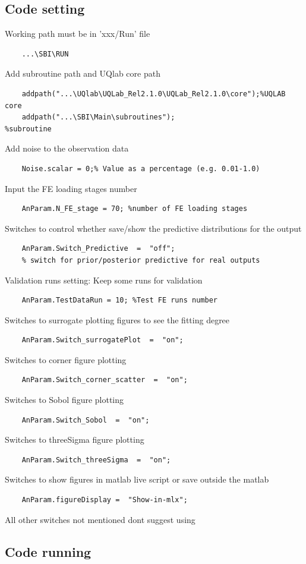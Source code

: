\documentclass{ol-softwaremanual}
\begin{document}
\subsection*{Code setting}
Working path must be in 'xxx/Run' file
\begin{verbatim}
    ...\SBI\RUN
\end{verbatim}
Add subroutine path and UQlab core path
\begin{verbatim}
    addpath("...\UQlab\UQLab_Rel2.1.0\UQLab_Rel2.1.0\core");%UQLAB core 
    addpath("...\SBI\Main\subroutines");                    %subroutine 
\end{verbatim}
Add noise to the observation data
\begin{verbatim}
    Noise.scalar = 0;% Value as a percentage (e.g. 0.01-1.0)
\end{verbatim}
Input the FE loading stages number
\begin{verbatim}
    AnParam.N_FE_stage = 70; %number of FE loading stages
\end{verbatim}
Switches to control whether save/show the predictive distributions for the output
\begin{verbatim}
    AnParam.Switch_Predictive  =  "off";
    % switch for prior/posterior predictive for real outputs
\end{verbatim}
Validation runs setting: Keep some runs for validation
\begin{verbatim}
    AnParam.TestDataRun = 10; %Test FE runs number
\end{verbatim}
Switches to surrogate plotting figures to see the fitting degree
\begin{verbatim}
    AnParam.Switch_surrogatePlot  =  "on"; 
\end{verbatim}
Switches to corner figure plotting
\begin{verbatim}
    AnParam.Switch_corner_scatter  =  "on";
\end{verbatim}
Switches to Sobol figure plotting
\begin{verbatim}
    AnParam.Switch_Sobol  =  "on";
\end{verbatim}
Switches to threeSigma figure plotting
\begin{verbatim}
    AnParam.Switch_threeSigma  =  "on";
\end{verbatim}
Switches to show figures in matlab live script or save outside the matlab
\begin{verbatim}
    AnParam.figureDisplay =  "Show-in-mlx";
\end{verbatim}
All other switches not mentioned dont suggest using


\subsection*{Code running}
\end{document}
